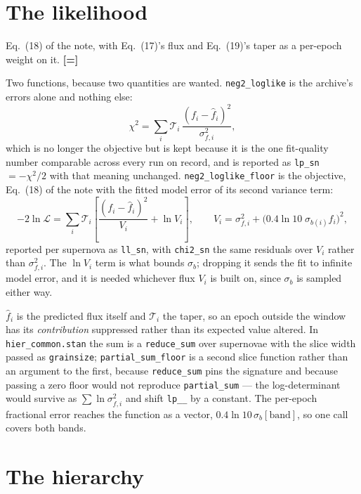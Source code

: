 \documentclass[11pt]{article}
\newcommand{\file}[1]{\texttt{#1}}
\newcommand{\code}[1]{\texttt{#1}}
\begin{document}
\section{The likelihood}

Eq.~(18) of the note, with Eq.~(17)'s flux and Eq.~(19)'s taper as a per-epoch weight on
it. \textbf{[=]}

Two functions, because two quantities are wanted.
\code{neg2\_loglike} is the archive's errors alone and nothing else:
\begin{equation}
  \chi^{2} = \sum_{i} \mathcal{T}_{i}\,
    \frac{(f_{i} - \hat f_{i})^{2}}{\sigma_{f,i}^{2}} ,
\end{equation}
which is no longer the objective but is kept because it is the one fit-quality number
comparable across every run on record, and is reported as \code{lp\_sn} $= -\chi^{2}/2$
with that meaning unchanged. \code{neg2\_loglike\_floor} is the objective, Eq.~(18) of the
note with the fitted model error of its second variance term:
\begin{equation}
  -2\ln\mathcal{L} = \sum_{i} \mathcal{T}_{i}
    \left[\frac{(f_{i} - \hat f_{i})^{2}}{V_{i}} + \ln V_{i}\right] ,
  \qquad
  V_{i} = \sigma_{f,i}^{2} + \bigl(0.4\ln 10\;\sigma_{b(i)} f_{i}\bigr)^{2} ,
\end{equation}
reported per supernova as \code{ll\_sn}, with \code{chi2\_sn} the same residuals over
$V_{i}$ rather than $\sigma_{f,i}^{2}$. The $\ln V_{i}$ term is what bounds $\sigma_{b}$;
dropping it sends the fit to infinite model error, and it is needed whichever flux
$V_{i}$ is built on, since $\sigma_{b}$ is sampled either way.

$\hat f_{i}$ is the predicted flux itself and $\mathcal{T}_{i}$ the taper, so an epoch
outside the window has its \emph{contribution} suppressed rather than its expected value
altered. In \file{hier\_common.stan} the sum is a \code{reduce\_sum} over supernovae with
the slice width passed as \code{grainsize}; \code{partial\_sum\_floor} is a second slice
function rather than an argument to the first, because \code{reduce\_sum} pins the
signature and because passing a zero floor would not reproduce \code{partial\_sum} --- the
log-determinant would survive as $\sum\ln\sigma_{f,i}^{2}$ and shift \code{lp\_\_} by a
constant. The per-epoch fractional error reaches the function as a vector,
$0.4\ln 10\,\sigma_{b}[\text{band}]$, so one call covers both bands.

\section{The hierarchy}
\end{document}
